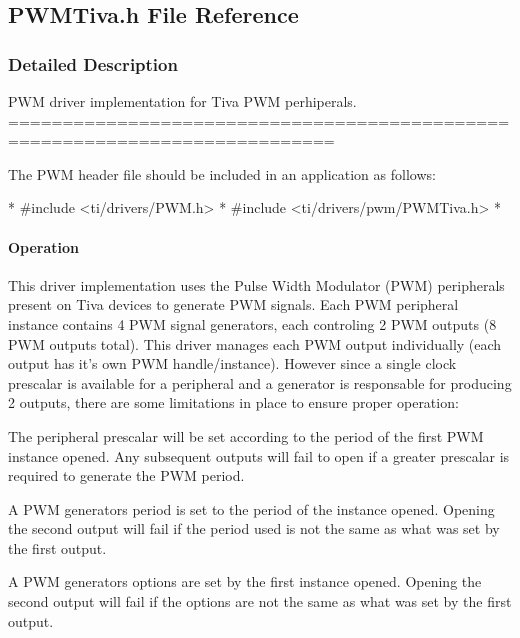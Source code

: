 \subsection{P\-W\-M\-Tiva.\-h File Reference}
\label{_p_w_m_tiva_8h}


\subsubsection{Detailed Description}
P\-W\-M driver implementation for Tiva P\-W\-M perhiperals. ============================================================================

The P\-W\-M header file should be included in an application as follows\-: 
\begin{DoxyCode}
*  #include <ti/drivers/PWM.h>
*  #include <ti/drivers/pwm/PWMTiva.h>
*  
\end{DoxyCode}


\paragraph*{Operation}

This driver implementation uses the Pulse Width Modulator (P\-W\-M) peripherals present on Tiva devices to generate P\-W\-M signals. Each P\-W\-M peripheral instance contains 4 P\-W\-M signal generators, each controling 2 P\-W\-M outputs (8 P\-W\-M outputs total). This driver manages each P\-W\-M output individually (each output has it's own P\-W\-M handle/instance). However since a single clock prescalar is available for a peripheral and a generator is responsable for producing 2 outputs, there are some limitations in place to ensure proper operation\-:
\begin{DoxyEnumerate}
\item The peripheral prescalar will be set according to the period of the first P\-W\-M instance opened. Any subsequent outputs will fail to open if a greater prescalar is required to generate the P\-W\-M period.
\item A P\-W\-M generators period is set to the period of the instance opened. Opening the second output will fail if the period used is not the same as what was set by the first output.
\item A P\-W\-M generators options are set by the first instance opened. Opening the second output will fail if the options are not the same as what was set by the first output.
\end{DoxyEnumerate}

